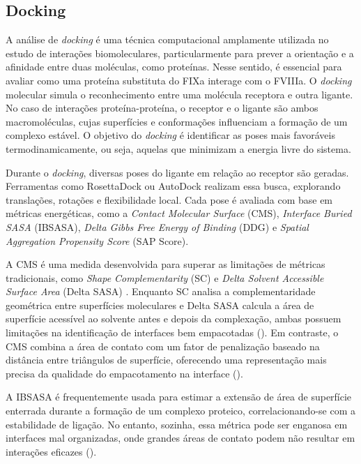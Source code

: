 \subsection{Docking}
\label{subsection:Docking} 
A análise de \textit{docking} é uma técnica computacional amplamente utilizada no estudo de interações biomoleculares,
particularmente para prever a orientação e a afinidade entre duas moléculas,
como proteínas. Nesse sentido, é essencial para avaliar como uma proteína substituta do FIXa interage com o FVIIIa. 
O \textit{docking} molecular simula o reconhecimento entre uma molécula receptora e outra ligante. 
No caso de interações proteína-proteína, o receptor e o ligante são ambos macromoléculas,
cujas superfícies e conformações influenciam a formação de um complexo estável.
O objetivo do \textit{docking} é identificar as poses mais favoráveis termodinamicamente, ou seja, 
aquelas que minimizam a energia livre do sistema.

Durante o \textit{docking}, diversas poses do ligante em relação ao receptor são geradas.
Ferramentas como RosettaDock ou AutoDock realizam essa busca, explorando translações, rotações e flexibilidade local.
Cada pose é avaliada com base em métricas energéticas, como a \textit{Contact Molecular Surface} (CMS), \textit{Interface Buried SASA} (IBSASA),
\textit{Delta Gibbs Free Energy of Binding} (DDG) e \textit{Spatial Aggregation Propensity Score} (SAP Score).

A CMS é uma medida desenvolvida para superar as limitações de métricas tradicionais, 
como \textit{Shape Complementarity} (SC) e \textit{Delta Solvent Accessible Surface Area} (Delta SASA) \cite{Docking}.
Enquanto SC analisa a complementaridade geométrica entre superfícies moleculares e 
Delta SASA calcula a área de superfície acessível ao solvente antes e depois da complexação,
ambas possuem limitações na identificação de interfaces bem empacotadas (\cite{Docking}).
Em contraste, o CMS combina a área de contato com um fator de penalização baseado na distância entre triângulos de superfície,
oferecendo uma representação mais precisa da qualidade do empacotamento na interface (\cite{Docking}).

A IBSASA é frequentemente usada para estimar a extensão de área de superfície enterrada durante a formação de um complexo proteico,
correlacionando-se com a estabilidade de ligação. 
No entanto, sozinha, essa métrica pode ser enganosa em interfaces mal organizadas, 
onde grandes áreas de contato podem não resultar em interações eficazes (\cite{Docking}). 

